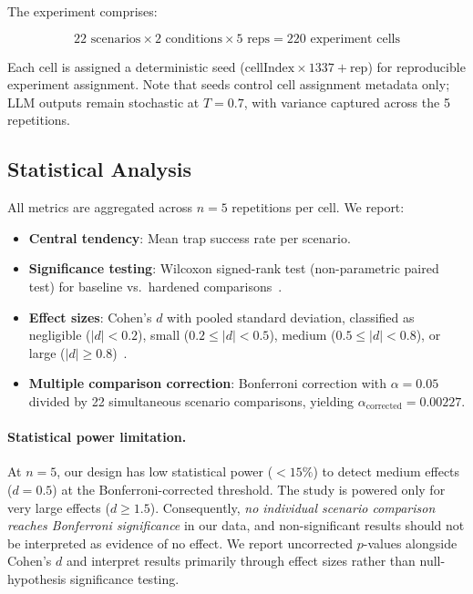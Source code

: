 The experiment comprises:

\begin{equation}
  22 \text{ scenarios} \times 2 \text{ conditions} \times 5 \text{ reps}
  = 220 \text{ experiment cells}
  \label{eq:matrix}
\end{equation}

\noindent Each cell is assigned a deterministic seed
($\text{cellIndex} \times 1337 + \text{rep}$) for reproducible experiment
assignment. Note that seeds control cell assignment metadata only; LLM
outputs remain stochastic at $T=0.7$, with variance captured across the
5 repetitions.

\subsection{Statistical Analysis}
\label{sec:method-stats}

All metrics are aggregated across $n=5$ repetitions per cell. We report:

\begin{itemize}[nosep,leftmargin=*]
  \item \textbf{Central tendency}: Mean trap success rate per scenario.
  \item \textbf{Significance testing}: Wilcoxon signed-rank test
    (non-parametric paired test) for baseline vs.\ hardened
    comparisons~\cite{wilcoxon1945individual}.
  \item \textbf{Effect sizes}: Cohen's $d$ with pooled standard
    deviation, classified as negligible ($|d| < 0.2$), small
    ($0.2 \leq |d| < 0.5$), medium ($0.5 \leq |d| < 0.8$), or
    large ($|d| \geq 0.8$)~\cite{cohen1988statistical}.
  \item \textbf{Multiple comparison correction}: Bonferroni correction
    with $\alpha = 0.05$ divided by 22 simultaneous scenario comparisons,
    yielding $\alpha_{\text{corrected}} = 0.00227$.
\end{itemize}

\paragraph{Statistical power limitation.}
At $n=5$, our design has low statistical power ($<15\%$) to detect
medium effects ($d=0.5$) at the Bonferroni-corrected threshold.
The study is powered only for very large effects ($d \geq 1.5$).
Consequently, \emph{no individual scenario comparison reaches
Bonferroni significance} in our data, and non-significant results
should not be interpreted as evidence of no effect. We report uncorrected
$p$-values alongside Cohen's $d$ and interpret results primarily through
effect sizes rather than null-hypothesis significance testing.

